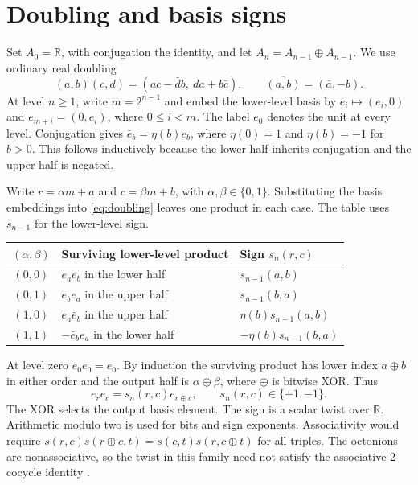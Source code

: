 \documentclass[11pt]{article}
\begin{document}
\section{Doubling and basis signs}
Set \(A_0=\mathbb R\), with conjugation the identity, and let
\(A_n=A_{n-1}\oplus A_{n-1}\). We use ordinary real doubling
\begin{equation}
 (a,b)(c,d)=(ac-\bar d b,\ da+b\bar c),
 \qquad \overline{(a,b)}=(\bar a,-b).
 \label{eq:doubling}
\end{equation}
At level \(n\geq 1\), write \(m=2^{n-1}\) and embed the lower-level
basis by \(e_i\mapsto(e_i,0)\) and \(e_{m+i}=(0,e_i)\), where
\(0\leq i<m\). The label \(e_0\) denotes the unit at every level.
Conjugation gives \(\bar e_b=\eta(b)e_b\), where \(\eta(0)=1\)
and \(\eta(b)=-1\) for \(b>0\). This follows inductively because the
lower half inherits conjugation and the upper half is negated.

Write \(r=\alpha m+a\) and \(c=\beta m+b\), with
\(\alpha,\beta\in\{0,1\}\). Substituting the basis embeddings into
\eqref{eq:doubling} leaves one product in each case. The table uses
\(s_{n-1}\) for the lower-level sign.
\begin{center}
\begin{tabular}{@{}c l l@{}}
\toprule
\((\alpha,\beta)\) & Surviving lower-level product & Sign \(s_n(r,c)\)\\
\midrule
\((0,0)\) & \(e_a e_b\) in the lower half & \(s_{n-1}(a,b)\)\\
\((0,1)\) & \(e_b e_a\) in the upper half & \(s_{n-1}(b,a)\)\\
\((1,0)\) & \(e_a\bar e_b\) in the upper half & \(\eta(b)s_{n-1}(a,b)\)\\
\((1,1)\) & \(-\bar e_b e_a\) in the lower half & \(-\eta(b)s_{n-1}(b,a)\)\\
\bottomrule
\end{tabular}
\end{center}
At level zero \(e_0e_0=e_0\). By induction the surviving product has
lower index \(a\oplus b\) in either order and the output half is
\(\alpha\oplus\beta\), where \(\oplus\) is bitwise XOR. Thus
\begin{equation}
 e_r e_c=s_n(r,c)e_{r\oplus c},\qquad s_n(r,c)\in\{+1,-1\}.
 \label{eq:twist}
\end{equation}
The XOR selects the output basis element. The sign is a scalar twist over
\(\mathbb R\). Arithmetic modulo two is used for bits and sign
exponents. Associativity would require
\(s(r,c)s(r\oplus c,t)=s(c,t)s(r,c\oplus t)\) for all triples.
The octonions are nonassociative, so the twist in this family need not
satisfy the associative 2-cocycle identity \cite{albuquerque}.
\end{document}
